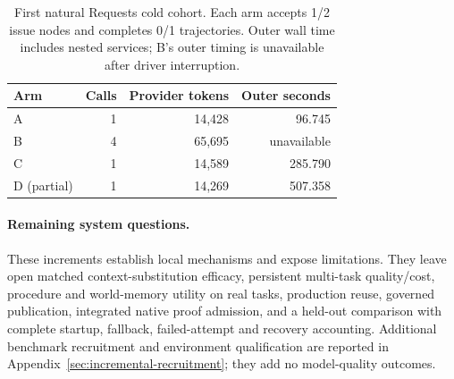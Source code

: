 \begin{table}[htbp]
\centering
\caption{First natural Requests cold cohort. Each arm accepts 1/2 issue nodes
and completes 0/1 trajectories. Outer wall time includes nested services;
B's outer timing is unavailable after driver interruption.}
\label{tab:requests-cold}
\begin{tabular}{lrrr}
\toprule
Arm & Calls & Provider tokens & Outer seconds \\
\midrule
A & 1 & 14,428 & 96.745 \\
B & 4 & 65,695 & unavailable \\
C & 1 & 14,589 & 285.790 \\
D (partial) & 1 & 14,269 & 507.358 \\
\bottomrule
\end{tabular}
\end{table}

\paragraph{Remaining system questions.}
These increments establish local mechanisms and expose limitations. They leave
open matched context-substitution efficacy, persistent multi-task quality/cost,
procedure and world-memory utility on real tasks, production reuse, governed
publication, integrated native proof admission, and a held-out comparison with complete
startup, fallback, failed-attempt and recovery accounting.
Additional benchmark recruitment and environment qualification are reported in
Appendix~\ref{sec:incremental-recruitment}; they add no model-quality outcomes.

